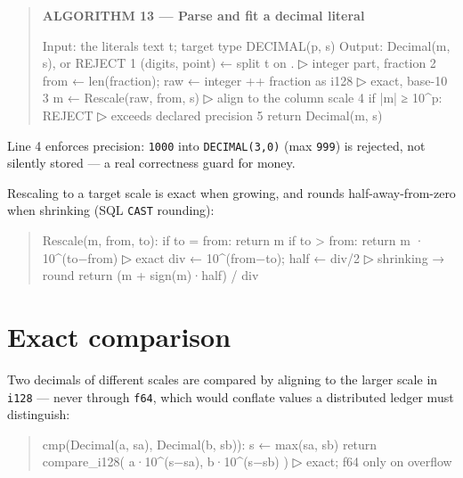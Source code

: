 \documentclass[
  11pt,
  openany]{book}
\newenvironment{Shaded}{}{}
\newcommand{\NormalTok}[1]{#1}
\begin{document}
\begin{quote}
\textbf{ALGORITHM 13 --- Parse and fit a decimal literal}

\begin{Shaded}
\begin{Highlighting}[]
\NormalTok{Input:  the literal\textquotesingle{}s text t; target type DECIMAL(p, s)}
\NormalTok{Output: Decimal(m, s), or REJECT}
\NormalTok{1  (digits, point) ← split t on \textquotesingle{}.\textquotesingle{}                  ▷ integer part, fraction}
\NormalTok{2  from ← len(fraction);  raw ← integer ++ fraction as i128   ▷ exact, base{-}10}
\NormalTok{3  m ← Rescale(raw, from, s)                          ▷ align to the column scale}
\NormalTok{4  if |m| ≥ 10\^{}p: REJECT                              ▷ exceeds declared precision}
\NormalTok{5  return Decimal(m, s)}
\end{Highlighting}
\end{Shaded}
\end{quote}

Line 4 enforces precision: \texttt{1000} into \texttt{DECIMAL(3,0)} (max
\texttt{999}) is rejected, not silently stored --- a real correctness
guard for money.

Rescaling to a target scale is exact when growing, and rounds
half-away-from-zero when shrinking (SQL \texttt{CAST} rounding):

\begin{quote}
\begin{Shaded}
\begin{Highlighting}[]
\NormalTok{Rescale(m, from, to):}
\NormalTok{  if to = from: return m}
\NormalTok{  if to \textgreater{} from: return m · 10\^{}(to−from)              ▷ exact}
\NormalTok{  div ← 10\^{}(from−to);  half ← div/2                   ▷ shrinking → round}
\NormalTok{  return (m + sign(m)·half) / div}
\end{Highlighting}
\end{Shaded}
\end{quote}

\section{Exact comparison}\label{exact-comparison}

Two decimals of different scales are compared by aligning to the larger
scale in \texttt{i128} --- never through \texttt{f64}, which would
conflate values a distributed ledger must distinguish:

\begin{quote}
\begin{Shaded}
\begin{Highlighting}[]
\NormalTok{cmp(Decimal(a, sa), Decimal(b, sb)):}
\NormalTok{  s ← max(sa, sb)}
\NormalTok{  return compare\_i128( a·10\^{}(s−sa),  b·10\^{}(s−sb) )    ▷ exact; f64 only on overflow}
\end{Highlighting}
\end{Shaded}
\end{quote}
\end{document}
